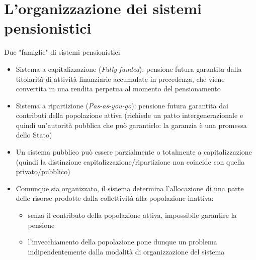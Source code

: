 \documentclass[aspectratio=64,11pt]{beamer}
\begin{document}
\section{L'organizzazione dei sistemi pensionistici}
\begin{frame}{Due "famiglie" di sistemi pensionistici}
\begin{itemize}
\item \alert{Sistema a capitalizzazione} (\emph{Fully funded}): pensione futura garantita
dalla titolarità di attività finanziarie accumulate in precedenza, che viene
convertita in una rendita perpetua al momento del pensionamento
\item \alert{Sistema a ripartizione} (\emph{Pas-as-you-go}): pensione futura garantita dai
contributi della popolazione attiva (richiede un patto intergenerazionale e
quindi un'autorità pubblica che può garantirlo: la garanzia è una promessa
dello Stato)
\item Un sistema pubblico può essere parzialmente o totalmente a capitalizzazione
(quindi la distinzione capitalizzazione/ripartizione non coincide con quella
privato/pubblico)
\item Comunque sia organizzato, il sistema determina l'allocazione di una parte
delle risorse prodotte dalla collettività alla popolazione
inattiva:
\begin{itemize}
\item senza il contributo della popolazione attiva, impossibile garantire la
pensione
\item l'invecchiamento della popolazione pone dunque un problema
indipendentemente dalla modalità di organizzazione del sistema
\end{itemize}
\end{itemize}
\end{frame}
\end{document}
